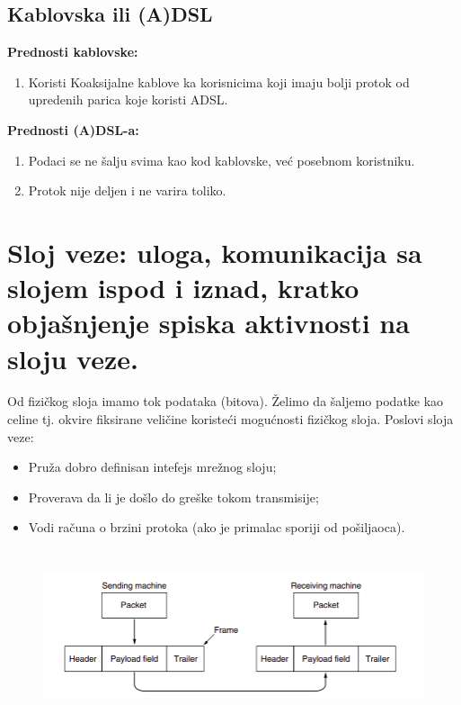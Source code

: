 \documentclass[a4paper]{article}
\begin{document}
    \subsection{Kablovska ili (A)DSL}
        \noindent \textbf{Prednosti kablovske:}
        \begin{enumerate}
            \item Koristi Koaksijalne kablove ka korisnicima koji imaju bolji protok od 
                  upredenih parica koje koristi ADSL.
        \end{enumerate}
        \textbf{Prednosti (A)DSL-a:}
        \begin{enumerate}
            \item Podaci se ne šalju svima kao kod kablovske, već posebnom koristniku.
            \item Protok nije deljen i ne varira toliko.
        \end{enumerate}
    

\section{Sloj veze: uloga, komunikacija sa slojem ispod i iznad, kratko objašnjenje spiska aktivnosti
na sloju veze. }
    Od fizičkog sloja imamo tok podataka (bitova). Želimo da šaljemo podatke kao celine tj. okvire
    fiksirane veličine koristeći mogućnosti fizičkog sloja. Poslovi sloja veze:
    \begin{itemize}
        \item Pruža dobro definisan intefejs mrežnog sloju;
        \item Proverava da li je došlo do greške tokom transmisije;
        \item Vodi računa o brzini protoka (ako je primalac sporiji od pošiljaoca).
    \end{itemize}
    \begin{figure}[H]
        \begin{center}
            \includegraphics[width=120mm,height=50mm]{Slike/sloj_veze1.png}
        \end{center}
    \end{figure}
\end{document}
